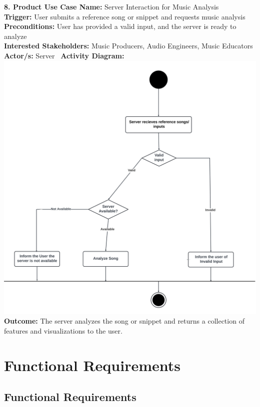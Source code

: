 \documentclass[12pt]{article}
\begin{document}
\textbf{8. Product Use Case Name:} Server Interaction for Music Analysis \\
\textbf{Trigger:} User submits a reference song or snippet and requests music analysis \\
\textbf{Preconditions:} User has provided a valid input, and the server is ready to analyze \\
\textbf{Interested Stakeholders:} Music Producers, Audio Engineers, Music Educators \\
\textbf{Actor/s:} Server \ \textbf{Activity Diagram:} \\
\includegraphics[width=\textwidth]{server_song_analysis.png} \\
\textbf{Outcome:} The server analyzes the song or snippet and returns a collection of features and visualizations to the user.

\section{Functional Requirements}
\subsection{Functional Requirements}
\hspace{14pt}
\end{document}
